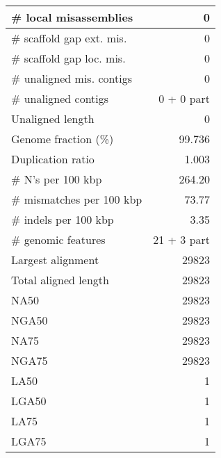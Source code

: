 \documentclass[12pt,a4paper]{article}
\begin{document}
\begin{table}[ht]
\begin{center}
\begin{tabular}{|l*{1}{|r}|}
\# local misassemblies & 0 \\ \hline
\# scaffold gap ext. mis. & 0 \\ \hline
\# scaffold gap loc. mis. & 0 \\ \hline
\# unaligned mis. contigs & 0 \\ \hline
\# unaligned contigs & 0 + 0 part \\ \hline
Unaligned length & 0 \\ \hline
Genome fraction (\%) & 99.736 \\ \hline
Duplication ratio & 1.003 \\ \hline
\# N's per 100 kbp & 264.20 \\ \hline
\# mismatches per 100 kbp & 73.77 \\ \hline
\# indels per 100 kbp & 3.35 \\ \hline
\# genomic features & 21 + 3 part \\ \hline
Largest alignment & 29823 \\ \hline
Total aligned length & 29823 \\ \hline
NA50 & 29823 \\ \hline
NGA50 & 29823 \\ \hline
NA75 & 29823 \\ \hline
NGA75 & 29823 \\ \hline
LA50 & 1 \\ \hline
LGA50 & 1 \\ \hline
LA75 & 1 \\ \hline
LGA75 & 1 \\ \hline
\end{tabular}
\end{center}
\end{table}
\end{document}
